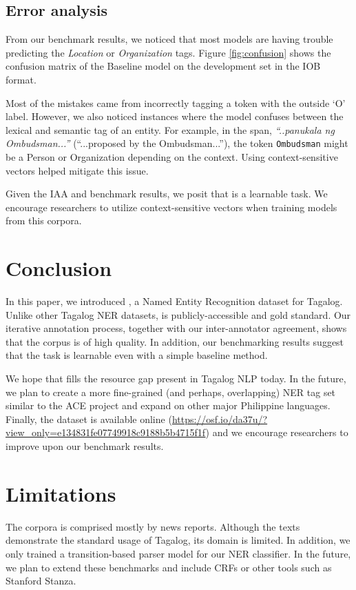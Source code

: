 \documentclass[11pt]{article}
\begin{document}
\subsection{Error analysis}

From our benchmark results, we noticed that most models are having trouble predicting the \textit{Location} or \textit{Organization} tags.
Figure \ref{fig:confusion} shows the confusion matrix of the Baseline model on the development set in the IOB format.

Most of the mistakes came from incorrectly tagging a token with the outside `O' label.
However, we also noticed instances where the model confuses between the lexical and semantic tag of an entity.
For example, in the span, \textit{``..panukala ng Ombudsman...''} (``...proposed by the Ombudsman...''), the token \texttt{Ombudsman} might be a Person or Organization depending on the context.
Using context-sensitive vectors helped mitigate this issue.

Given the IAA and benchmark results, we posit that \tlunified{} is a learnable task.
We encourage researchers to utilize context-sensitive vectors when training models from this corpora.


\section{Conclusion}

In this paper, we introduced \tlunified{}, a Named Entity Recognition dataset for Tagalog.
Unlike other Tagalog NER datasets, \tlunified{} is publicly-accessible and gold standard.
Our iterative annotation process, together with our inter-annotator agreement, shows that the corpus is of high quality.
In addition, our benchmarking results suggest that the task is learnable even with a simple baseline method.

We hope that \tlunified{} fills the resource gap present in Tagalog NLP today.
In the future, we plan to create a more fine-grained (and perhaps, overlapping) NER tag set similar to the ACE project and expand on other major Philippine languages.
Finally, the dataset is available online (\url{https://osf.io/da37u/?view_only=e134831fe07749918c9188b5b4715f1f}) and we encourage researchers to improve upon our benchmark results.


\section*{Limitations}

The \tlunified{} corpora is comprised mostly by news reports.
Although the texts demonstrate the standard usage of Tagalog, its domain is limited.
In addition, we only trained a transition-based parser model for our NER classifier.
In the future, we plan to extend these benchmarks and include CRFs or other tools such as Stanford Stanza.




\end{document}
